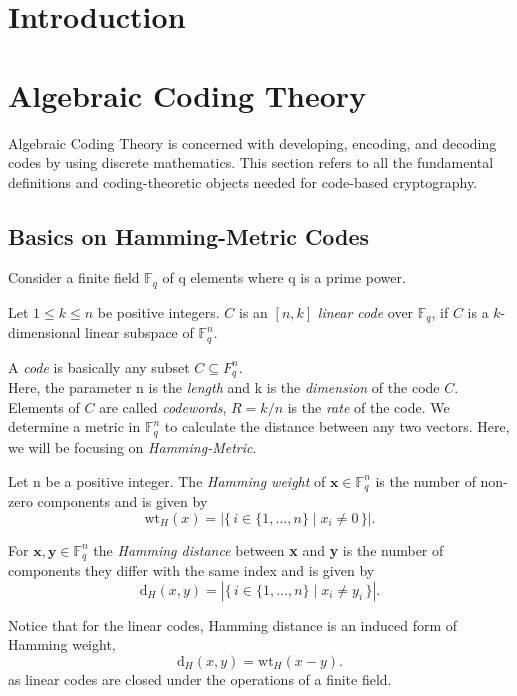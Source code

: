 \section{Introduction}

\section{Algebraic Coding Theory}
\label{sec:algeb_coding}
Algebraic Coding Theory is concerned with developing, encoding, and decoding codes by using discrete mathematics. This section refers to all the fundamental definitions and coding-theoretic objects needed for code-based cryptography. 

\subsection{Basics on Hamming-Metric Codes}
Consider a finite field $\mathbb F_q$ of q elements where q is a prime power.
\begin{definition} Let $1 \leq k \leq n$ be positive integers. $C$ is an $[n, k]$ \textit{linear code} over $\mathbb F_q$, if $C$ is a $k$-dimensional linear subspace of $\mathbb F_q^n$.
\end{definition}

\noindent A \textit{code} is basically any subset $C \subseteq F_q^n$.
\\[0.4cm]
Here, the parameter n is the \textit{length} and k is the \textit{dimension} of the code $C$. Elements of $C$ are called \textit{codewords}, $R = k/n$ is the \textit{rate} of the code. We determine a metric in $\mathbb F_q^n$ to calculate the distance between any two vectors. Here, we will be focusing on \textit{Hamming-Metric}.

\begin{definition}
Let n be a positive integer. The \textit{Hamming weight} of 
$\textbf{x} \in \mathbb F_q^n$ is the number of non-zero components and is given by
\[
\mathrm{wt}_H(x) = 
\left| \{\, i \in \{1, \dots, n\} 
\mid x_i \neq 0 \,\} \right|.
\]
\end{definition}

\begin{definition}
For $\textbf{x}, \textbf{y} \in \mathbb F_q^n$ the \textit{Hamming distance} between \textbf{x} and \textbf{y} is the number of components they differ with the same index and is given by
\[
\mathrm{d}_H(x, y) =
\left| \{\, i \in \{1, \dots, n\} 
\mid x_i \neq y_i \,\} \right|.
\]    
\end{definition}
Notice that for the linear codes, Hamming distance is an induced form of Hamming weight,
\[
\mathrm{d}_H(x, y) = \mathrm{wt}_H(x-y).
\]
as linear codes are closed under the operations of a finite field.

